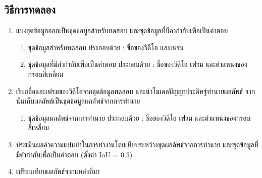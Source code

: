 \subsection*{วิธีการทดลอง}
	\begin{enumerate}
		\item แบ่งชุดข้อมูลออกเป็นชุดข้อมูลสำหรับทดสอบ และชุดข้อมูลที่มีคำกำกับเพื่อเป็นคำตอบ
			\begin{enumerate}
				\item ชุดข้อมูลสำหรับทดสอบ ประกอบด้วย : ชื่อของวิดีโอ และเฟรม
				\item ชุดข้อมูลที่มีคำกำกับเพื่อเป็นคำตอบ ประกอบด้วย : ชื่อของวิดีโอ เฟรม และตำแหน่งของกรอบสี่เหลี่ยม
			\end{enumerate}
		\item เรียกชื่อและเฟรมของวิดีโอจากชุดข้อมูลทดสอบ และนำโมเดลปัญญาประดิษฐ์ทำนายผลลัพธ์ จากนั้นเก็บผลลัพธ์เป็นชุดข้อมูลผลลัพธ์จากการทำนาย
			\begin{enumerate}
				\item ชุดข้อมูลผลลัพธ์จากการทำนาย ประกอบด้วย : ชื่อของวิดีโอ เฟรม และตำแหน่งของกรอบสี่เหลี่ยม
			\end{enumerate}
		\item ประเมินผลค่าความแม่นยำในการทำงานโดยเทียบระหว่างชุดผลลัพธ์จากการทำนาย และชุดข้อมูลที่มีคำกำกับเพื่อเป็นคำตอบ (ตั้งค่า IoU = 0.5)	
		\item เปรียบเทียบผลลัพธ์จากแหล่งที่มา
\end{enumerate}
